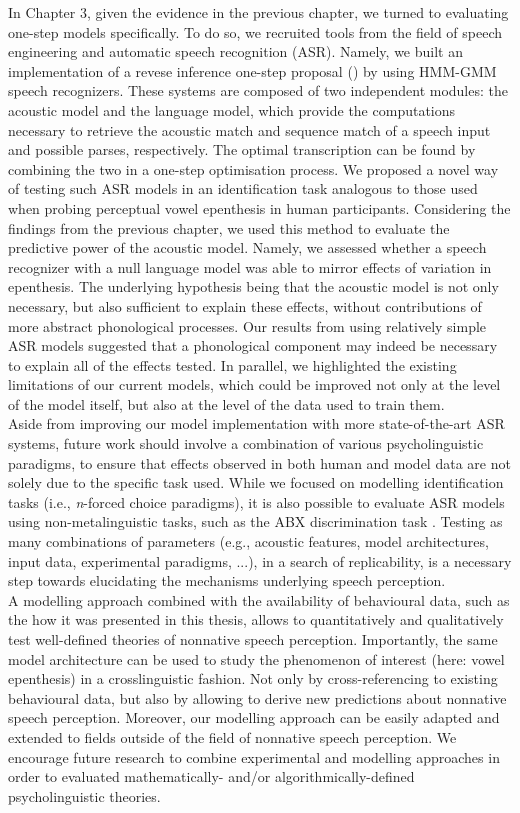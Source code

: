 In Chapter 3, given the evidence in the previous chapter, we turned to evaluating one-step models specifically. To do so, we recruited tools from the field of speech engineering and automatic speech recognition (ASR). Namely, we built an implementation of a revese inference one-step proposal (\cite{wilson2013}) by using HMM-GMM speech recognizers. These systems are composed of two independent modules: the acoustic model and the language model, which provide the computations necessary to retrieve the acoustic match and sequence match of a speech input and possible parses, respectively. The optimal transcription can be found by combining the two in a one-step optimisation process. We proposed a novel way of testing such ASR models in an identification task analogous to those used when probing perceptual vowel epenthesis in human participants.
Considering the findings from the previous chapter, we used this method to evaluate the predictive power of the acoustic model. Namely, we assessed whether a speech recognizer with a null language model was able to mirror effects of variation in epenthesis. The underlying hypothesis being that the acoustic model is not only necessary, but also sufficient to explain these effects, without contributions of more abstract phonological processes. Our results from using relatively simple ASR models suggested that a phonological component may indeed be necessary to explain all of the effects tested. In parallel, we highlighted the existing limitations of our current models, which could be improved not only at the level of the model itself, but also at the level of the data used to train them.  \\

Aside from improving our model implementation with more state-of-the-art ASR systems, future work should involve a combination of various psycholinguistic paradigms, to ensure that effects observed in both human and model data are not solely due to the specific task used. While we focused on modelling identification tasks (i.e., \textit{n}-forced choice paradigms), it is also possible to evaluate ASR models using non-metalinguistic tasks, such as the ABX discrimination task \cite{schatz2018}. Testing as many combinations of parameters (e.g., acoustic features, model architectures, input data, experimental paradigms, ...), in a search of replicability, is a necessary step towards elucidating the mechanisms underlying speech perception.\\

A modelling approach combined with the availability of behavioural data, such as the how it was presented in this thesis, allows to quantitatively and qualitatively test well-defined theories of nonnative speech perception. Importantly, the same model architecture can be used to study the phenomenon of interest (here: vowel epenthesis) in a crosslinguistic fashion. Not only by cross-referencing to existing behavioural data, but also by allowing to derive new predictions about nonnative speech perception. Moreover, our modelling approach can be easily adapted and extended to fields outside of the field of nonnative speech perception. We encourage future research to combine experimental and modelling approaches in order to evaluated mathematically- and/or algorithmically-defined psycholinguistic theories. 
